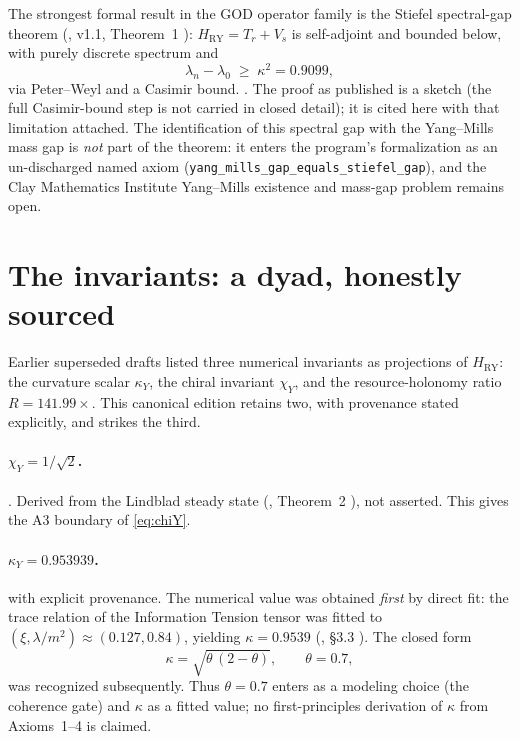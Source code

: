 \documentclass{alienfolio}
\begin{document}
The strongest formal result in the GOD operator family is the Stiefel
spectral-gap theorem (, v1.1, Theorem~1
\cite{ryh11}): $H_{\mathrm{RY}} = T_{r} + V_{s}$ is self-adjoint and
bounded below, with purely discrete spectrum and
\begin{equation}
\lambda_{n} - \lambda_{0} \;\ge\; \kappa^{2} = 0.9099,
\label{eq:gap}
\end{equation}
via Peter--Weyl and a Casimir bound. . The proof as
published is a sketch (the full Casimir-bound step is not carried in
closed detail); it is cited here with that limitation attached. The
identification of this spectral gap with the Yang--Mills mass gap
\cite{jaffe00} is \emph{not} part of the theorem: it enters the
program's formalization as an un-discharged named axiom
(\texttt{yang\_mills\_gap\_equals\_stiefel\_gap}), and the Clay
Mathematics Institute Yang--Mills existence and mass-gap problem remains
open.

\section{The invariants: a dyad, honestly sourced}
\label{sec:invariants}

Earlier superseded drafts listed three numerical invariants as projections
of $H_{\mathrm{RY}}$: the curvature scalar $\kappa_{Y}$, the chiral
invariant $\chi_{Y}$, and the resource-holonomy ratio $R = 141.99\times$.
This canonical edition retains two, with provenance stated explicitly,
and strikes the third.

\paragraph{$\chi_{Y} = 1/\sqrt{2}$.} . Derived from
the Lindblad steady state (, Theorem~2
\cite{sovcog}), not asserted. This gives the A3 boundary of
\eqref{eq:chiY}.

\paragraph{$\kappa_{Y} = 0.953939$.}  with explicit
provenance. The numerical value was obtained \emph{first} by direct fit:
the trace relation of the Information Tension tensor was fitted to
$(\xi, \lambda/m^{2}) \approx (0.127, 0.84)$, yielding
$\kappa = 0.9539$ (, \S3.3 \cite{rec20652234}).
The closed form
\begin{equation}
\kappa = \sqrt{\theta\,(2-\theta)}, \qquad \theta = 0.7,
\label{eq:kappa}
\end{equation}
was recognized subsequently. Thus $\theta = 0.7$ enters as a modeling
choice (the coherence gate) and $\kappa$ as a fitted value; no first-principles
derivation of $\kappa$ from Axioms~1--4 is claimed.
\end{document}
